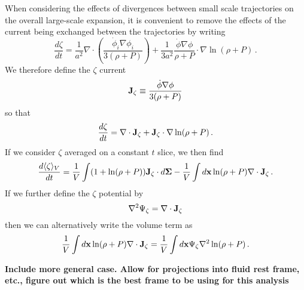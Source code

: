 When considering the effects of divergences between small scale trajectories on the overall large-scale expansion, it is convenient to remove the effects of the current being exchanged between the trajectories by writing
\begin{equation}
  \frac{d\zeta}{dt} = \frac{1}{a^2}\nabla\cdot\left(\frac{\dot{\phi}_i\nabla\phi_i}{3(\rho+P)}\right) + \frac{1}{3a^2}\frac{\dot{\phi}\nabla\phi}{\rho+P}\cdot\nabla\ln(\rho+P) \, .
\end{equation}
We therefore define the $\zeta$ current
\begin{equation}
  {\bf J}_{\zeta} \equiv \frac{\dot{\phi}\nabla\phi}{3(\rho+P)}
\end{equation}
so that
\begin{equation}
  \frac{d\zeta}{dt} = \nabla\cdot{\bf J}_\zeta + {\bf J}_\zeta\cdot\nabla\ln(\rho+P) \, .
\end{equation}
If we consider $\zeta$ averaged on a constant $t$ slice, we then find
\begin{equation}
  \frac{d\langle\zeta\rangle_V}{dt} = \frac{1}{V}\int (1+\ln(\rho+P)){\bf J}_\zeta\cdot d{\bf \Sigma} - \frac{1}{V}\int d{\bf x}\ln(\rho+P)\nabla\cdot{\bf J}_\zeta \, .
\end{equation}
If we further define the $\zeta$ potential by
\begin{equation}
  \nabla^2\Psi_\zeta = \nabla\cdot{\bf J}_\zeta
\end{equation}
then we can alternatively write the volume term as
\begin{equation}
  \frac{1}{V}\int d{\bf x}\ln(\rho+P)\nabla\cdot{\bf J}_\zeta = \frac{1}{V}\int d{\bf x}\Psi_\zeta \nabla^2\ln(\rho+P) \, .
\end{equation}

{\bf Include more general case.  Allow for projections into fluid rest frame, etc., figure out which is the best frame to be using for this analysis}
